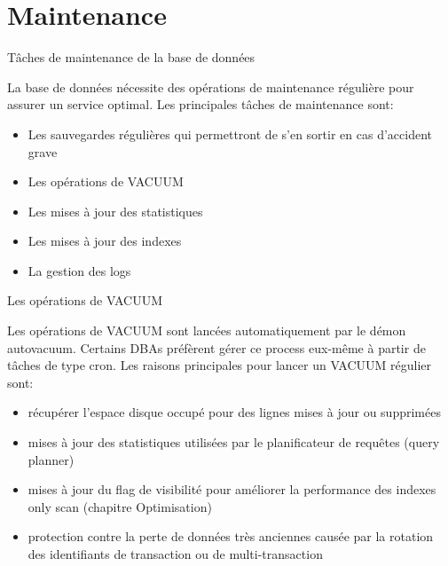 
\section{Maintenance}


\begin{frame}[fragile]{Tâches de maintenance de la base de données}

   La base de données nécessite des opérations de maintenance régulière pour assurer un service optimal.
   Les principales tâches de maintenance sont:
   \begin{itemize}
      \item Les sauvegardes régulières qui permettront de s'en sortir en cas d'accident grave
      \item Les opérations de VACUUM
      \item Les mises à jour des statistiques
      \item Les mises à jour des indexes
      \item La gestion des logs
   \end{itemize}

\begin{toile}
\end{toile}

\end{frame}


\begin{frame}[fragile]{Les opérations de VACUUM}

   Les opérations de VACUUM sont lancées automatiquement par le démon \textsf{autovacuum}. Certains DBAs préfèrent gérer ce process eux-même à partir de tâches de type cron.
   Les raisons principales pour lancer un VACUUM régulier sont:

   \begin{itemize}
      \item récupérer l'espace disque occupé pour des lignes mises à jour ou supprimées
      \item mises à jour des statistiques utilisées par le planificateur de requêtes (query planner)
      \item mises à jour du flag de visibilité pour améliorer la performance des indexes only scan (chapitre Optimisation)
      \item protection contre la perte de données très anciennes causée par la rotation des identifiants de transaction ou de multi-transaction
   \end{itemize}

\begin{toile}
\end{toile}

\end{frame}

